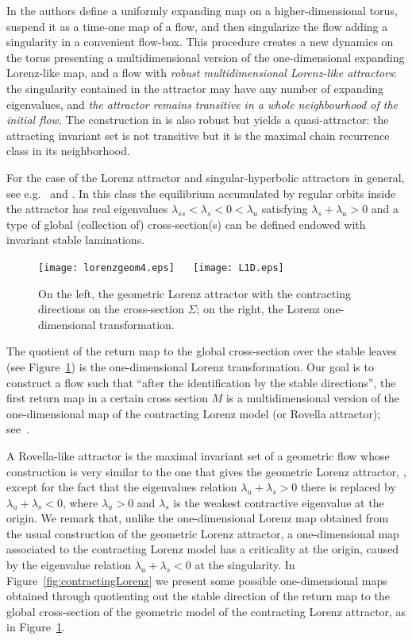 \documentclass[reqno,12pt,a4paper]{amsart}
\theoremstyle{plain}
\theoremstyle{definition}
\begin{document}
In \cite{BPV97} the authors define a uniformly expanding map
on a higher-dimensional torus, suspend it as a time-one map
of a flow, and then singularize the flow adding a
singularity in a convenient flow-box. This procedure creates
a new dynamics on the torus presenting a multidimensional
version of the one-dimensional expanding Lorenz-like map,
and a flow with \emph{robust multidimensional Lorenz-like
  attractors}: the singularity contained in the attractor
may have any number of expanding eigenvalues, and \emph{the
  attractor remains transitive in a whole neighbourhood of
  the initial flow.} The construction in \cite{ST98} is also
robust but yields a quasi-attractor: the attracting
invariant set is not transitive but it is the maximal chain
recurrence class in its neighborhood.

For the case of the Lorenz attractor and singular-hyperbolic
attractors in general, see e.g.~\cite{viana2000i} and
\cite{AraPac2010}. In this class the equilibrium accumulated
by regular orbits inside the attractor has real eigenvalues
$\lambda_{ss}<\lambda_s<0<\lambda_u$ satisfying
$\lambda_{s}+\lambda_u>0$ and a type of global (collection
of) cross-section(s) can be defined endowed with invariant
stable laminations.
\begin{figure}[htbp]
  \texttt{[image: lorenzgeom4.eps]}
  $\quad$
  \texttt{[image: L1D.eps]}
  \caption{On the left, the geometric Lorenz attractor with
    the contracting directions on the cross-section
    $\Sigma$; on the right, the Lorenz one-dimensional
    transformation.}
  \label{fig:geom-lorenz}
\end{figure}
The quotient of the return map to the global cross-section
over the stable leaves (see Figure~\ref{fig:geom-lorenz})
is the one-dimensional Lorenz transformation.
Our goal is to construct a flow such that ``after the
identification by the stable directions'', the first return
map in a certain cross section $M$ is a multidimensional
version of the one-dimensional map of the contracting Lorenz
model (or Rovella attractor); see~\cite{Ro93}.

A Rovella-like attractor is the maximal invariant set of a
geometric flow whose construction is very similar to the one
that gives the geometric Lorenz attractor,
\cite{GW79,ABS77,AraPac2010}, except for the fact that the
eigenvalues relation $\lambda_u + \lambda_s > 0$ there is
replaced by $\lambda_u + \lambda_s < 0$, where $\lambda_u>
0$ and $\lambda_s$ is the weakest contractive eigenvalue at
the origin. We remark that, unlike the one-dimensional
Lorenz map obtained from the usual construction of the
geometric Lorenz attractor, a one-dimensional map associated
to the contracting Lorenz model has a criticality at the
origin, caused by the eigenvalue relation $\lambda_u +
\lambda_s<0$ at the singularity.  In
Figure~\ref{fig:contractingLorenz} we present some possible
one-dimensional maps obtained through quotienting out the
stable direction of the return map to the global
cross-section of the geometric model of the contracting
Lorenz attractor, as in Figure~\ref{fig:geom-lorenz}.
\end{document}
